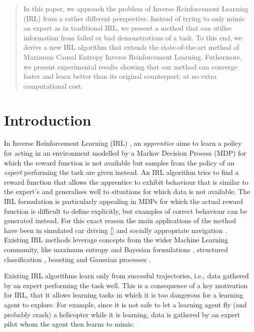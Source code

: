 \documentclass[conference]{IEEEtran}
\begin{document}
\begin{abstract}
In this paper, we approach the problem of Inverse Reinforcement Learning (IRL) from a rather different perspective. Instead of trying to only mimic an expert as in 
traditional IRL, we present a method that can utilise information from failed or bad demonstrations of a task. To this end, we derive a new IRL algorithm that extends the state-of-the-art method of Maximum Causal Entropy Inverse Reinforcement Learning.  Futhermore, we present experimental results showing that our method can converge faster and learn better than its original counterpart, at no extra computational cost. 
\end{abstract}

\IEEEpeerreviewmaketitle

\section{Introduction}
In Inverse Reinforcement Learning (IRL) \cite{ng2000algorithms}, an \emph{apprentice} aims to learn a policy for acting in an environment modelled by a Markov Decision Process (MDP) for which the reward function is not available but samples from the policy of an \emph{expert} performing the task are given instead. An IRL algorithm tries to find a reward function that allows the apprentice to exhibit behaviour  that is similar to the expert's and generalises well to situations for which data is not available. The IRL formulation is particularly appealing in MDPs for which the actual reward function is difficult to define explicitly, but examples of correct behaviour can be generated instead. For this exact reason the main applications of the method have been in simulated car driving [] and socially appropriate navigation \cite{henry2010learning,vasquez2014inverse}. Existing IRL methods leverage concepts from the wider Machine Learning community, like maximum entropy \cite{ziebart2008maximum} and Bayesian formulations \cite{ramachandran2007bayesian}, structured classification \cite{ratliff2006maximum}, boosting \cite{ratliff2007boosting} and Gaussian processes \cite{levine2011nonlinear}.

Existing IRL algorithms learn only from succesful trajectories, i.e., data gathered by an expert performing the task well.  This is a consequence of a key motivation for IRL, that it allows learning tasks in which it is too dangerous for a learning agent to explore.  For example, since it is not safe to let a learning agent fly (and probably crash) a helicopter while it is learning, data is gathered by an expert pilot whom the agent then learns to mimic. 
\end{document}
